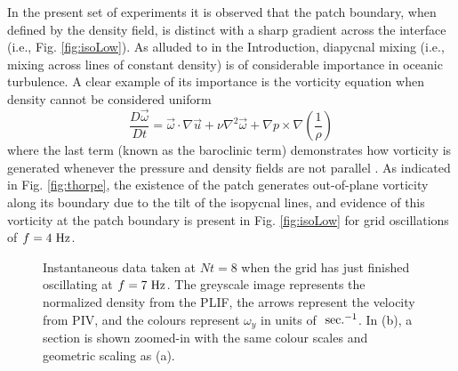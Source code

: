 \documentclass{piv13-abstract}
\newcommand{\unit}[1]{\ensuremath{\, \mathrm{\hspace{0.5mm}#1}}}
\newcommand{\vect}[1]{\vec{#1}}
\newcommand{\figLabel}{Fig. }
\begin{document}
In the present set of experiments it is observed that the patch boundary, when defined by the density field, is distinct with a sharp gradient across the interface (i.e., \figLabel\ref{fig:isoLow}). As alluded to in the Introduction, diapycnal mixing (i.e., mixing across lines of constant density) is of considerable importance in oceanic turbulence. A clear example of its importance is the vorticity equation when density cannot be considered uniform
\begin{equation}
\frac{D\vect{\omega}}{Dt}=\vect{\omega}\cdot \nabla \vect{u} + \nu\nabla^2\vect{\omega} + \nabla p \times \nabla\left(\frac{1}{\rho}\right)
\end{equation}
where the last term (known as the baroclinic term) demonstrates how vorticity is generated whenever the pressure and density fields are not parallel \cite{bookTurner1973}. As indicated in \figLabel\ref{fig:thorpe}, the existence of the patch generates out-of-plane vorticity along its boundary due to the tilt of the isopycnal lines, and evidence of this vorticity at the patch boundary is present in \figLabel\ref{fig:isoLow} for grid oscillations of $f=4\unit{Hz}$.

\begin{figure}[h]
\centering
{}
\caption{Instantaneous data taken at $Nt=8$ when the grid has just finished oscillating at $f=7\unit{Hz}$. The greyscale image represents the normalized density from the PLIF, the arrows represent the velocity from PIV, and the colours represent $\omega_y$ in units of $\unit{sec.^{-1}}$. In (b), a section is shown zoomed-in with the same colour scales and geometric scaling as (a). \label{fig:isoHigh}}
\end{figure}
\end{document}
